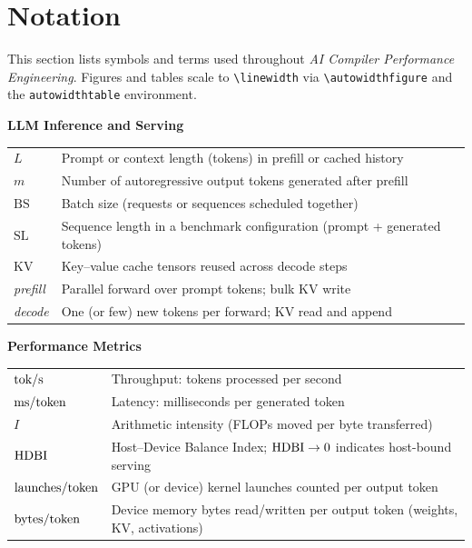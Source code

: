\chapter*{Notation}
\label{notation}


This section lists symbols and terms used throughout \emph{AI Compiler Performance
Engineering}.
Figures and tables scale to \texttt{\textbackslash linewidth} via
\texttt{\textbackslash autowidthfigure} and the \texttt{autowidthtable} environment.

\newcommand{\notationsection}[2]{%
  \vspace{\notationgap}%
  \par\noindent\centerline{\bfseries #1}\par\vspace{0.35em}%
  \bgroup
  \def\arraystretch{1.5}%
  \begin{tabularx}{\textwidth}{@{}>{\raggedright\arraybackslash}p{}X@{}}%
  #2%
  \end{tabularx}%
  \egroup
  \par
}

\notationsection{LLM Inference and Serving}{%
$L$ & Prompt or context length (tokens) in prefill or cached history\\
$m$ & Number of autoregressive output tokens generated after prefill\\
$\text{BS}$ & Batch size (requests or sequences scheduled together)\\
$\text{SL}$ & Sequence length in a benchmark configuration (prompt + generated tokens)\\
$\text{KV}$ & Key--value cache tensors reused across decode steps\\
\textit{prefill} & Parallel forward over prompt tokens; bulk KV write\\
\textit{decode} & One (or few) new tokens per forward; KV read and append\\
}

\notationsection{Performance Metrics}{%
$\text{tok/s}$ & Throughput: tokens processed per second\\
$\text{ms/token}$ & Latency: milliseconds per generated token\\
$I$ & Arithmetic intensity (FLOPs moved per byte transferred)\\
$\mathrm{HDBI}$ & Host--Device Balance Index; $\mathrm{HDBI} \to 0$ indicates host-bound serving\\
$\text{launches/token}$ & GPU (or device) kernel launches counted per output token\\
$\text{bytes/token}$ & Device memory bytes read/written per output token (weights, KV, activations)\\
}

